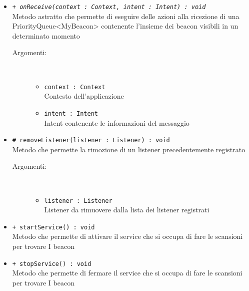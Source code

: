 \documentclass[../DefinizioneDiProdotto.tex]{subfiles}
\begin{document}
\begin{description}
\begin{itemize}
\begin{description}
		\end{description}
		\item \texttt{+ \textit{onReceive(context : Context, intent : Intent) : void}}\\
		Metodo astratto che permette di eseguire delle azioni alla ricezione di una PriorityQueue<MyBeacon> contenente l'insieme dei beacon visibili in un determinato momento
		\begin{description}
			\item[Argomenti:] \
			\begin{itemize}
				\item \texttt{context : Context}\\
				Contesto dell'applicazione\item \texttt{intent : Intent}\\
				Intent contenente le informazioni del messaggio\end{itemize}
		\end{description}
		\item \texttt{\# removeListener(listener : Listener) : void}\\
		Metodo che permette la rimozione di un listener precedentemente registrato
		\begin{description}
			\item[Argomenti:] \
			\begin{itemize}
				\item \texttt{listener : Listener}\\
				Listener da rimuovere dalla lista dei listener registrati\end{itemize}
		\end{description}
		\item \texttt{+ startService() : void}\\
		Metodo che permette di attivare il service che si occupa di fare le scansioni per trovare I beacon
		\item \texttt{+ stopService() : void}\\
		Metodo che permette di fermare il service che si occupa di fare le scansioni per trovare I beacon
	\end{itemize}
\end{description}
\end{document}
